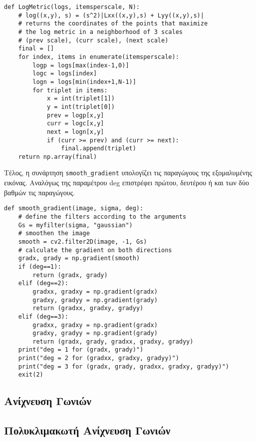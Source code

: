 \documentclass{article}
\newcommand{\eng}[1]{\foreignlanguage{english}{#1}}
\begin{document}
\begin{lstlisting}[breaklines=true, showstringspaces=false]
def LogMetric(logs, itemsperscale, N):
    # log((x,y), s) = (s^2)|Lxx((x,y),s) + Lyy((x,y),s)|
    # returns the coordinates of the points that maximize
    # the log metric in a neighborhood of 3 scales
    # (prev scale), (curr scale), (next scale)
    final = []
    for index, items in enumerate(itemsperscale):
        logp = logs[max(index-1,0)]
        logc = logs[index]
        logn = logs[min(index+1,N-1)] 
        for triplet in items:
            x = int(triplet[1])
            y = int(triplet[0])
            prev = logp[x,y]
            curr = logc[x,y]
            next = logn[x,y]
            if (curr >= prev) and (curr >= next):
                final.append(triplet)
    return np.array(final)
\end{lstlisting}

Τέλος, η συνάρτηση \eng{\texttt{smooth\_gradient}} υπολογίζει τις παραγώγους της εξομαλυμένης εικόνας. Αναλόγως της παραμέτρου \eng{deg} επιστρέφει πρώτου, δευτέρου ή και των δύο βαθμών τις παραγώγους.

\begin{lstlisting}[breaklines=true, showstringspaces=false]
def smooth_gradient(image, sigma, deg):
    # define the filters according to the arguments
    Gs = myfilter(sigma, "gaussian")
    # smoothen the image
    smooth = cv2.filter2D(image, -1, Gs)
    # calculate the gradient on both directions 
    gradx, grady = np.gradient(smooth)
    if (deg==1):
        return (gradx, grady)
    elif (deg==2):
        gradxx, gradxy = np.gradient(gradx)
        gradxy, gradyy = np.gradient(grady)
        return (gradxx, gradxy, gradyy)
    elif (deg==3):
        gradxx, gradxy = np.gradient(gradx)
        gradxy, gradyy = np.gradient(grady)
        return (gradx, grady, gradxx, gradxy, gradyy)
    print("deg = 1 for (gradx, grady)")
    print("deg = 2 for (gradxx, gradxy, gradyy)")
    print("deg = 3 for (gradx, grady, gradxx, gradxy, gradyy)")
    exit(2)
\end{lstlisting}

\subsection{Ανίχνευση Γωνιών}



\subsection{Πολυκλιμακωτή Ανίχνευση Γωνιών}
\end{document}
